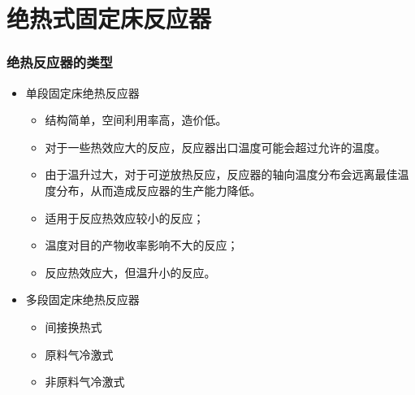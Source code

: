 \section{绝热式固定床反应器}


\begin{frame}
    \frametitle{绝热反应器的类型}

    \begin{itemize}
        \item 单段固定床绝热反应器
            \begin{itemize}
                \item[\bigcirc ] 结构简单，空间利用率高，造价低。
                \item[\times ] 对于一些热效应大的反应，反应器出口温度可能会超过允许的温度。
                \item[\times ] 由于温升过大，对于可逆放热反应，反应器的轴向温度分布会远离最佳温度分布，从而造成反应器的生产能力降低。
                \item 适用于反应热效应较小的反应；
                \item 温度对目的产物收率影响不大的反应；
                \item 反应热效应大，但温升小的反应。
            \end{itemize}
        
        \item 多段固定床绝热反应器
            \begin{itemize}
                \item 间接换热式
                \item 原料气冷激式
                \item 非原料气冷激式
            \end{itemize}
        
    \end{itemize}

\end{frame}


